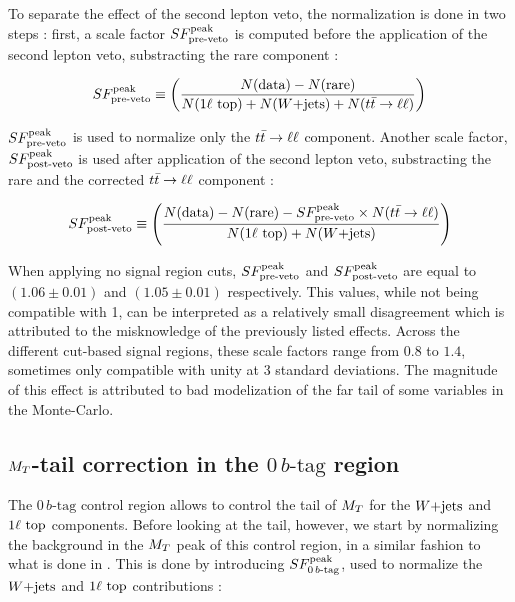    To separate the effect of the second lepton veto, the  normalization is done in two
    steps : first, a scale factor $SF_{\text{pre-veto}}^{\text{peak}}$ is computed before the application of the
    second lepton veto, substracting the rare component :

    \begin{equation}
        SF_{\text{pre-veto}}^{\text{peak}} \equiv \left( \frac{N(\text{data}) - N(\text{rare})}{N(1\ell~\text{top}) + N(\text{$W$+jets}) + N(t\bar{t} \rightarrow \ell \ell)} \right)
        \label{eq:SFpreDefinition}
    \end{equation}

    $SF_{\text{pre-veto}}^{\text{peak}}$ is used to normalize only the $t\bar{t} \rightarrow \ell \ell$ component. Another scale factor,
    $SF_{\text{post-veto}}^{\text{peak}}$ is used after application of the second lepton veto, substracting the rare
    and the corrected $t\bar{t} \rightarrow \ell \ell$ component :

    \begin{equation}
        SF_{\text{post-veto}}^{\text{peak}} \equiv \left( \frac{N(\text{data}) - N(\text{rare}) - SF_{\text{pre-veto}}^{\text{peak}} \times N(t\bar{t} \rightarrow \ell \ell)}{N(1\ell~\text{top}) + N(\text{$W$+jets})} \right)
        \label{eq:SFpostDefinition}
    \end{equation}

     When applying no signal region cuts, $SF_{\text{pre-veto}}^{\text{peak}}$ and $SF_{\text{post-veto}}^{\text{peak}}$ are equal to
     $(1.06 \pm 0.01)$ and $(1.05 \pm 0.01)$ respectively. This values, while not
     being compatible with 1, can be interpreted as a relatively small disagreement
     which is attributed to the misknowledge of the previously listed effects. Across the
     different cut-based signal regions, these scale factors range from $0.8$ to $1.4$,
     sometimes only compatible with unity at 3 standard deviations. The magnitude of this
     effect is attributed to bad modelization of the far tail of some variables in the
     Monte-Carlo.

        \subsection{$M_T$-tail correction in the $0\, b\text{-tag}$ region \label{sec:MTtailCorrection}}

    The $0\, b\text{-tag}$ control region allows to control the tail of $M_T$ for the $\text{$W$+jets}$ and
    $1\ell~\text{top}$ components. Before looking at the tail, however, we start by normalizing
    the background in the $M_T$ peak of this control region, in a similar fashion to what
    is done in . This is done by introducing $SF_{0\, b\text{-tag}}^{\text{peak}}$,
    used to normalize the $\text{$W$+jets}$ and $1\ell~\text{top}$ contributions :

